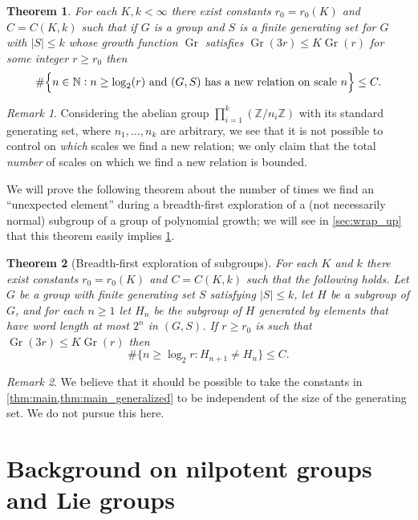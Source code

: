\documentclass[11pt]{article}
\numberwithin{equation}{section}
\theoremstyle{plain}
\newtheorem{thm}{Theorem}[section]
\theoremstyle{definition}
\theoremstyle{remark}
\newtheorem{remark}{Remark}[section]
\numberwithin{equation}{section}
\newcommand{\Z}{\mathbb Z}
\numberwithin{equation}{section}
\newcommand{\Gr}{\operatorname{Gr}}
\begin{document}
\begin{thm}
\label{thm:main}
For each $K,k<\infty$ there exist constants $r_0=r_0(K)$ and $C=C(K,k)$ such that if $G$ is a group and $S$ is a finite generating set for $G$ with $|S|\leq k$ whose growth function $\operatorname{Gr}$ satisfies $\operatorname{Gr}(3r)\leq K \operatorname{Gr}(r)$ for some integer $r\geq r_0$ then
\[
\#\Bigl\{n\in \mathbb{N} : n\geq \log_2(r) \text{ and $(G,S)$ has a new relation on scale $n$} \Bigr\}\leq C.
\]
\end{thm}

\begin{remark}
Considering the abelian group $\prod_{i=1}^k(\Z/n_i \Z)$ with its standard generating set, where $n_1,\ldots,n_k$ are arbitrary, we see that it is not possible to control on \emph{which} scales we find a new relation; we only claim that the total \emph{number} of scales on which we find a new relation is bounded.
\end{remark}

We will prove the following theorem about the number of times we find an ``unexpected element'' during a breadth-first exploration of a (not necessarily normal) subgroup of a group of polynomial growth; we will see in \cref{sec:wrap_up} that this theorem easily implies \cref{thm:main}.

\begin{thm}[Breadth-first exploration of subgroups]
\label{thm:main_generalized}
For each $K$ and $k$ there exist constants $r_0=r_0(K)$ and $C=C(K,k)$ such that the following holds.
Let $G$ be a group with finite generating set $S$ satisfying $|S|\leq k$, let $H$ be a subgroup of $G$, and for each $n\geq 1$ let $H_n$ be the subgroup of $H$ generated by elements that have word length at most $2^n$ in $(G,S)$. If $r\geq r_0$ is such that $\Gr(3r)\leq K \Gr(r)$ then 
\[
\#\{n \geq \log_2 r :H_{n+1}\neq H_n\} \leq C.
\]
\end{thm}

\medskip

\begin{remark}
We believe that it should be possible to take the constants in \cref{thm:main,thm:main_generalized} to be independent of the size of the generating set. We do not pursue this here.
\end{remark}


\section{Background on nilpotent groups and Lie groups}
\end{document}
